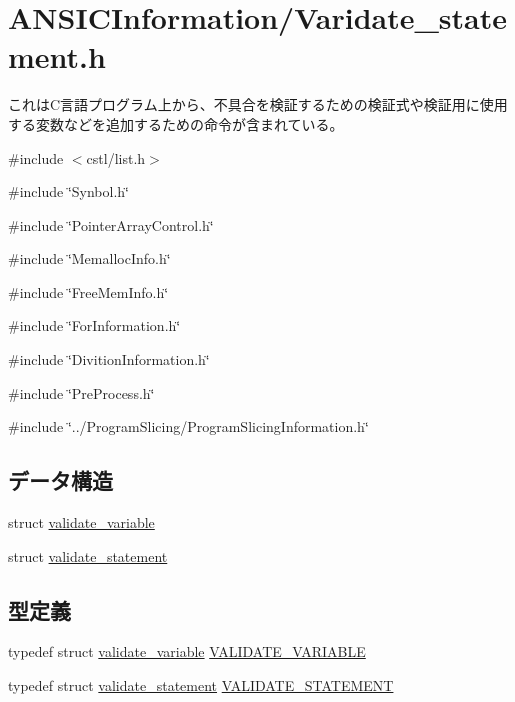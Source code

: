 \section{ANSICInformation/Varidate\_\-statement.h}
\label{Varidate__statement_8h}


これはC言語プログラム上から、不具合を検証するための検証式や検証用に使用する変数などを追加するための命令が含まれている。  


{\ttfamily \#include $<$cstl/list.h$>$}\par
{\ttfamily \#include \char`\"{}Synbol.h\char`\"{}}\par
{\ttfamily \#include \char`\"{}PointerArrayControl.h\char`\"{}}\par
{\ttfamily \#include \char`\"{}MemallocInfo.h\char`\"{}}\par
{\ttfamily \#include \char`\"{}FreeMemInfo.h\char`\"{}}\par
{\ttfamily \#include \char`\"{}ForInformation.h\char`\"{}}\par
{\ttfamily \#include \char`\"{}DivitionInformation.h\char`\"{}}\par
{\ttfamily \#include \char`\"{}PreProcess.h\char`\"{}}\par
{\ttfamily \#include \char`\"{}../ProgramSlicing/ProgramSlicingInformation.h\char`\"{}}\par
\subsection*{データ構造}
\begin{DoxyCompactItemize}
\item 
struct \hyperlink{structvalidate__variable}{validate\_\-variable}
\item 
struct \hyperlink{structvalidate__statement}{validate\_\-statement}
\end{DoxyCompactItemize}
\subsection*{型定義}
\begin{DoxyCompactItemize}
\item 
typedef struct \hyperlink{structvalidate__variable}{validate\_\-variable} \hyperlink{Varidate__statement_8h_a44deffa9c818ee2269d1af086048deee}{VALIDATE\_\-VARIABLE}
\item 
typedef struct \hyperlink{structvalidate__statement}{validate\_\-statement} \hyperlink{Varidate__statement_8h_aa29cf26f061e9a911576b7bd9ca1c8eb}{VALIDATE\_\-STATEMENT}
\end{DoxyCompactItemize}
